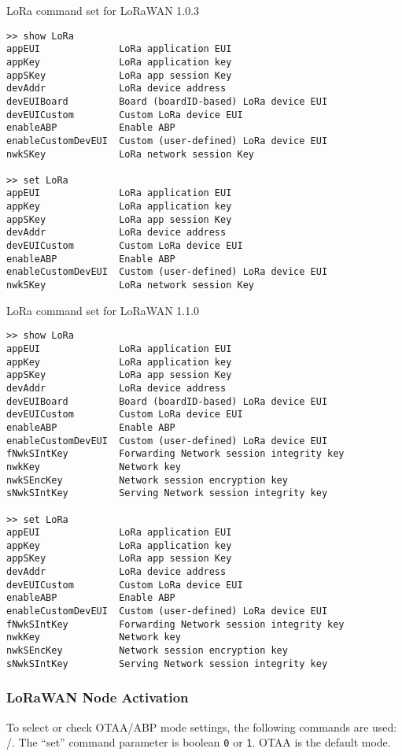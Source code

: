 \begin{docCodeExampleTitled}{LoRa command set for LoRaWAN 1.0.3}
\begin{verbatim}
>> show LoRa
appEUI              LoRa application EUI
appKey              LoRa application key
appSKey             LoRa app session Key
devAddr             LoRa device address
devEUIBoard         Board (boardID-based) LoRa device EUI
devEUICustom        Custom LoRa device EUI
enableABP           Enable ABP
enableCustomDevEUI  Custom (user-defined) LoRa device EUI
nwkSKey             LoRa network session Key

>> set LoRa
appEUI              LoRa application EUI
appKey              LoRa application key
appSKey             LoRa app session Key
devAddr             LoRa device address
devEUICustom        Custom LoRa device EUI
enableABP           Enable ABP
enableCustomDevEUI  Custom (user-defined) LoRa device EUI
nwkSKey             LoRa network session Key
\end{verbatim}
\end{docCodeExampleTitled}

\begin{docCodeExampleTitled}{LoRa command set for LoRaWAN 1.1.0}
\begin{verbatim}
>> show LoRa
appEUI              LoRa application EUI
appKey              LoRa application key
appSKey             LoRa app session Key
devAddr             LoRa device address
devEUIBoard         Board (boardID-based) LoRa device EUI
devEUICustom        Custom LoRa device EUI
enableABP           Enable ABP
enableCustomDevEUI  Custom (user-defined) LoRa device EUI
fNwkSIntKey         Forwarding Network session integrity key
nwkKey              Network key
nwkSEncKey          Network session encryption key
sNwkSIntKey         Serving Network session integrity key

>> set LoRa
appEUI              LoRa application EUI
appKey              LoRa application key
appSKey             LoRa app session Key
devAddr             LoRa device address
devEUICustom        Custom LoRa device EUI
enableABP           Enable ABP
enableCustomDevEUI  Custom (user-defined) LoRa device EUI
fNwkSIntKey         Forwarding Network session integrity key
nwkKey              Network key
nwkSEncKey          Network session encryption key
sNwkSIntKey         Serving Network session integrity key
\end{verbatim}
\end{docCodeExampleTitled}

\subsubsection{LoRaWAN Node Activation}
To select or check OTAA/ABP mode settings, the following commands are used: /. The “set” command parameter is boolean {\tt 0} or {\tt 1}. OTAA is the default mode.

